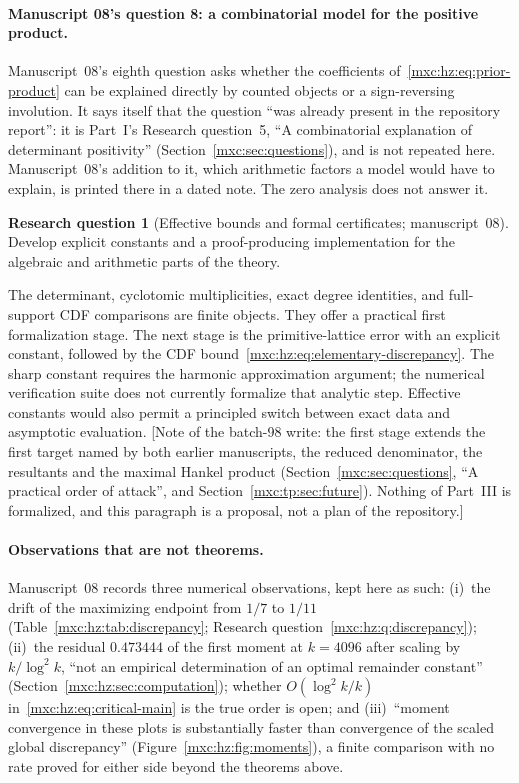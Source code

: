 \documentclass[11pt]{article}
\numberwithin{equation}{section}
\theoremstyle{definition}
\newtheorem{question}{Research question}
\theoremstyle{remark}
\begin{document}
\paragraph{Manuscript 08's question 8: a combinatorial model for the positive product.}
Manuscript~08's eighth question asks whether the coefficients
of~\eqref{mxc:hz:eq:prior-product} can be explained directly by counted
objects or a sign-reversing involution. It says itself that the question
``was already present in the repository report'': it is Part~I's Research
question~5, ``A combinatorial explanation of determinant positivity''
(Section~\ref{mxc:sec:questions}), and is not repeated here. Manuscript~08's
addition to it, which arithmetic factors a model would have to explain, is
printed there in a dated note. The zero analysis does not answer it.

\begin{question}[Effective bounds and formal certificates; manuscript~08]\label{mxc:hz:q:certificates}
Develop explicit constants and a proof-producing implementation for the
algebraic and arithmetic parts of the theory.
\end{question}

The determinant, cyclotomic multiplicities, exact degree identities, and
full-support CDF comparisons are finite objects. They offer a practical
first formalization stage. The next stage is the primitive-lattice error
with an explicit constant, followed by the CDF
bound~\eqref{mxc:hz:eq:elementary-discrepancy}. The sharp constant requires
the harmonic approximation argument; the numerical verification suite does
not currently formalize that analytic step. Effective constants would also
permit a principled switch between exact data and asymptotic evaluation.
[Note of the batch-98 write: the first stage extends the first target named
by both earlier manuscripts, the reduced denominator, the resultants and
the maximal Hankel product (Section~\ref{mxc:sec:questions}, ``A practical
order of attack'', and Section~\ref{mxc:tp:sec:future}). Nothing of
Part~III is formalized, and this paragraph is a proposal, not a plan of the
repository.]

\paragraph{Observations that are not theorems.} Manuscript~08 records three
numerical observations, kept here as such:
(i)~the drift of the maximizing endpoint from $1/7$ to $1/11$
(Table~\ref{mxc:hz:tab:discrepancy}; Research
question~\ref{mxc:hz:q:discrepancy});
(ii)~the residual $0.473444$ of the first moment at $k=4096$ after scaling
by $k/\log^2k$, ``not an empirical determination of an optimal remainder
constant'' (Section~\ref{mxc:hz:sec:computation}); whether
$O(\log^2k/k)$ in~\eqref{mxc:hz:eq:critical-main} is the true order is
open; and
(iii)~``moment convergence in these plots is substantially faster than
convergence of the scaled global discrepancy''
(Figure~\ref{mxc:hz:fig:moments}), a finite comparison with no rate proved
for either side beyond the theorems above.
\end{document}
